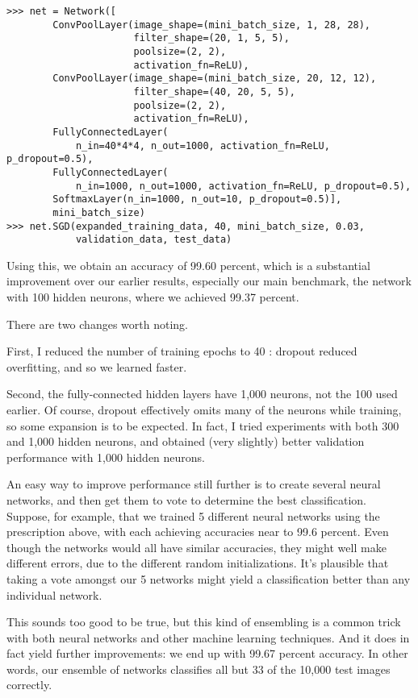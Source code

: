 \begin{lstlisting}
>>> net = Network([
        ConvPoolLayer(image_shape=(mini_batch_size, 1, 28, 28), 
                      filter_shape=(20, 1, 5, 5), 
                      poolsize=(2, 2), 
                      activation_fn=ReLU),
        ConvPoolLayer(image_shape=(mini_batch_size, 20, 12, 12), 
                      filter_shape=(40, 20, 5, 5), 
                      poolsize=(2, 2), 
                      activation_fn=ReLU),
        FullyConnectedLayer(
            n_in=40*4*4, n_out=1000, activation_fn=ReLU, p_dropout=0.5),
        FullyConnectedLayer(
            n_in=1000, n_out=1000, activation_fn=ReLU, p_dropout=0.5),
        SoftmaxLayer(n_in=1000, n_out=10, p_dropout=0.5)], 
        mini_batch_size)
>>> net.SGD(expanded_training_data, 40, mini_batch_size, 0.03, 
            validation_data, test_data)
\end{lstlisting}

Using this, we obtain an accuracy of 99.60 percent, which is a substantial improvement over our earlier results, especially our main benchmark, the network with 100 hidden neurons, where we achieved 99.37 percent.

There are two changes worth noting. 

First, I reduced the number of training epochs to 40 : dropout reduced overfitting, and so we learned faster.

Second, the fully-connected hidden layers have 1,000 neurons, not the 100 used earlier. Of course, dropout effectively omits many of the neurons while training, so some expansion is to be expected. In fact, I tried experiments with both 300 and 1,000 hidden neurons, and obtained (very slightly) better validation performance with 1,000 hidden neurons.

 An easy way to improve performance still further is to create several neural networks, and then get them to vote to determine the best classification. Suppose, for example, that we trained 5 different neural networks using the prescription above, with each achieving accuracies near to 99.6 percent. Even though the networks would all have similar accuracies, they might well make different errors, due to the different random initializations. It's plausible that taking a vote amongst our 5 networks might yield a classification better than any individual network.

This sounds too good to be true, but this kind of ensembling is a common trick with both neural networks and other machine learning techniques. And it does in fact yield further improvements: we end up with 99.67 percent accuracy. In other words, our ensemble of networks classifies all but 33 of the 10,000 test images correctly. 

